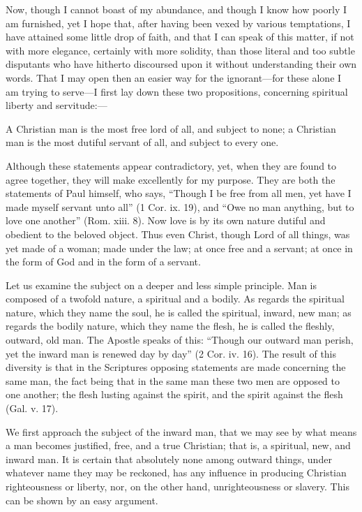 Now, though I cannot boast of my abundance, and though I know how poorly I
am furnished, yet I hope that, after having been vexed by various
temptations, I have attained some little drop of faith, and that I can
speak of this matter, if not with more elegance, certainly with more
solidity, than those literal and too subtle disputants who have hitherto
discoursed upon it without understanding their own words. That I may open
then an easier way for the ignorant—for these alone I am trying to
serve—I first lay down these two propositions, concerning spiritual
liberty and servitude:—

A Christian man is the most free lord of all, and subject to none; a
Christian man is the most dutiful servant of all, and subject to every
one.

Although these statements appear contradictory, yet, when they are found
to agree together, they will make excellently for my purpose. They are
both the statements of Paul himself, who says, ``Though I be free from all
men, yet have I made myself servant unto all'' (1 Cor. ix. 19), and ``Owe no
man anything, but to love one another'' (Rom. xiii. 8). Now love is by its
own nature dutiful and obedient to the beloved object. Thus even Christ,
though Lord of all things, was yet made of a woman; made under the law; at
once free and a servant; at once in the form of God and in the form of a
servant.

Let us examine the subject on a deeper and less simple principle. Man is
composed of a twofold nature, a spiritual and a bodily. As regards the
spiritual nature, which they name the soul, he is called the spiritual,
inward, new man; as regards the bodily nature, which they name the flesh,
he is called the fleshly, outward, old man. The Apostle speaks of this:
``Though our outward man perish, yet the inward man is renewed day by day''
(2 Cor. iv. 16). The result of this diversity is that in the Scriptures
opposing statements are made concerning the same man, the fact being that
in the same man these two men are opposed to one another; the flesh
lusting against the spirit, and the spirit against the flesh (Gal. v. 17).

We first approach the subject of the inward man, that we may see by what
means a man becomes justified, free, and a true Christian; that is, a
spiritual, new, and inward man. It is certain that absolutely none among
outward things, under whatever name they may be reckoned, has any
influence in producing Christian righteousness or liberty, nor, on the
other hand, unrighteousness or slavery. This can be shown by an easy
argument.

